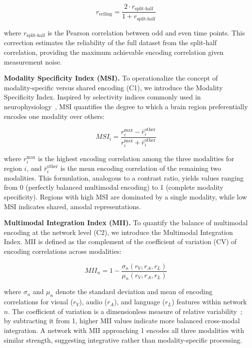 \documentclass[10pt,letterpaper]{article}
\begin{document}
\begin{equation}\label{eq:ceiling}
r_{\text{ceiling}} = \frac{2 \cdot r_{\text{split-half}}}{1 + r_{\text{split-half}}}
\tag{3}
\end{equation}

where $r_{\text{split-half}}$ is the Pearson correlation between odd and even time points. This correction estimates the reliability of the full dataset from the split-half correlation, providing the maximum achievable encoding correlation given measurement noise.

\textbf{Modality Specificity Index (MSI).} To operationalize the concept of modality-specific versus shared encoding (C1), we introduce the Modality Specificity Index. Inspired by selectivity indices commonly used in neurophysiology~\citep{desimone1984stimulus}, MSI quantifies the degree to which a brain region preferentially encodes one modality over others:

\begin{equation}\label{eq:msi}
MSI_i = \frac{r_i^{\max} - \bar{r}_i^{\text{other}}}{r_i^{\max} + \bar{r}_i^{\text{other}}}
\tag{4}
\end{equation}

where $r_i^{\max}$ is the highest encoding correlation among the three modalities for region $i$, and $\bar{r}_i^{\text{other}}$ is the mean encoding correlation of the remaining two modalities. This formulation, analogous to a contrast ratio, yields values ranging from 0 (perfectly balanced multimodal encoding) to 1 (complete modality specificity). Regions with high MSI are dominated by a single modality, while low MSI indicates shared, amodal representations.

\textbf{Multimodal Integration Index (MII).} To quantify the balance of multimodal encoding at the network level (C2), we introduce the Multimodal Integration Index. MII is defined as the complement of the coefficient of variation (CV) of encoding correlations across modalities:

\begin{equation}\label{eq:mii}
MII_n = 1 - \frac{\sigma_n(r_V, r_A, r_L)}{\mu_n(r_V, r_A, r_L)}
\tag{5}
\end{equation}

where $\sigma_n$ and $\mu_n$ denote the standard deviation and mean of encoding correlations for visual ($r_V$), audio ($r_A$), and language ($r_L$) features within network $n$. The coefficient of variation is a dimensionless measure of relative variability~\citep{everitt2010cambridge}; by subtracting it from 1, higher MII values indicate more balanced cross-modal integration. A network with MII approaching 1 encodes all three modalities with similar strength, suggesting integrative rather than modality-specific processing.
\end{document}
